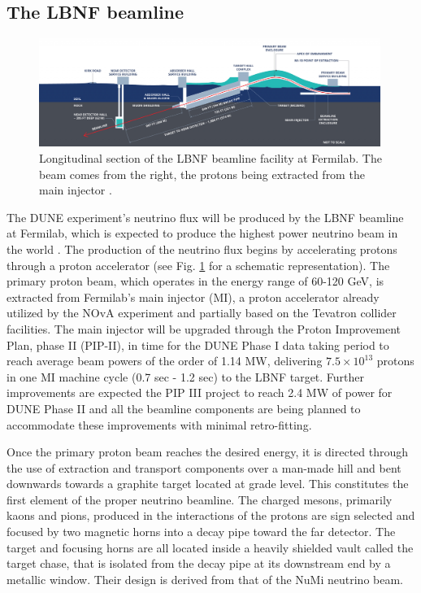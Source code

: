 \subsection{The LBNF beamline}
\begin{figure}[!h]
     \centering
     \includegraphics[width=0.99\textwidth]{figures/ch3-DUNE/LBNF-IL-graphic-Fermilab-LBNF.png}
     \caption[Longitudinal section of the LBNF beamline facility at Fermilab]{Longitudinal section of the LBNF beamline facility at Fermilab. The beam comes from the right, the protons being extracted from the main injector \cite{LBNFpage}. }
        \label{fig:LBNFgrafics}
\end{figure}
The DUNE experiment's neutrino flux will be produced by the LBNF beamline at Fermilab, which is expected to produce the highest power neutrino beam in the world \cite{DUNE:2016LBNFTDR, Papadimitriou:2016ksv}. The production of the neutrino flux begins by accelerating protons through a proton accelerator (see Fig. \ref{fig:LBNFgrafics} for a schematic representation). The primary proton beam, which operates in the energy range of 60-120 GeV, is extracted from Fermilab's main injector (MI), a proton accelerator already utilized by the NOvA experiment and partially based on the Tevatron collider facilities. The main injector will be upgraded through the Proton Improvement Plan, phase II (PIP-II), in time for the DUNE Phase I data taking period to reach average beam powers of the order of 1.14 MW, delivering $7.5 \times 10^{13}$ protons in one MI machine cycle (0.7 sec - 1.2 sec) to the LBNF target. Further improvements are expected the PIP III project to reach 2.4 MW of power for DUNE Phase II and all the beamline components are being planned to accommodate these improvements with minimal retro-fitting. 

Once the primary proton beam reaches the desired energy, it is directed through the use of extraction and transport components over a man-made hill and bent downwards towards a graphite target located at grade level. This constitutes the first element of the proper neutrino beamline. The charged mesons, primarily kaons and pions, produced in the interactions of the protons are sign selected and focused by two magnetic horns into a decay pipe toward the far detector. The target and focusing horns are all located inside a heavily shielded vault called the target chase, that is isolated from the decay pipe at its downstream end by a metallic window. Their design is derived from that of the NuMi neutrino beam. 

